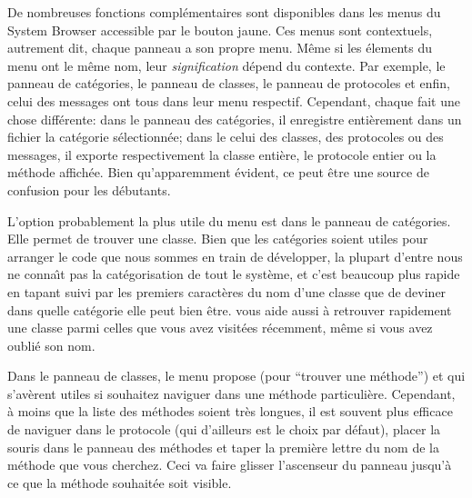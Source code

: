 \documentclass[a4paper,10pt,twoside]{book}
\begin{document}
De nombreuses fonctions compl\'ementaires sont disponibles dans les menus du
System Browser accessible par le bouton jaune. Ces menus sont contextuels, 
autrement dit, chaque panneau a son propre menu.
M\^eme si les \'elements du menu ont le m\^eme nom, leur \emph{signification}
d\'epend du contexte. Par exemple, le panneau de cat\'egories, le
panneau de classes, le panneau de protocoles et enfin, celui des messages
ont tous  dans leur menu respectif. Cependant, chaque 
 fait une chose diff\'erente: dans le panneau des cat\'egories,
il enregistre enti\`erement dans un fichier la cat\'egorie s\'electionn\'ee; dans le celui des classes, des protocoles ou des messages, il exporte respectivement la classe enti\`ere, le protocole entier ou la m\'ethode affich\'ee.
Bien qu'apparemment \'evident, ce peut \^etre une source de confusion pour
les d\'ebutants. 

L'option probablement la plus utile du menu est  
dans le panneau de cat\'egories. 
Elle permet de trouver une classe.  
Bien que les cat\'egories soient utiles pour arranger le code que nous 
sommes en train de d\'evelopper, la plupart d'entre nous ne conna\^{\i}t pas
la cat\'egorisation de tout le syst\`eme, et c'est beaucoup plus rapide
en tapant  suivi par les premiers caract\`eres du nom d'une 
classe que de deviner dans quelle cat\'egorie elle peut bien \^etre.
 vous aide aussi \`a retrouver rapidement
une classe parmi celles que vous avez visit\'ees r\'ecemment, m\^eme si vous
avez oubli\'e son nom.

Dans le panneau de classes, le menu propose  (pour ``trouver
une m\'ethode'') et
 qui s'av\`erent utiles si souhaitez
naviguer dans une m\'ethode particuli\`ere. Cependant, 
\`a moins que la liste des m\'ethodes soient tr\`es longues, il est souvent
plus efficace de naviguer dans le protocole  
(qui d'ailleurs est le choix par d\'efaut), placer la souris dans le
panneau des m\'ethodes et taper la premi\`ere lettre du nom de la m\'ethode
que vous cherchez.
Ceci va faire glisser l'ascenseur du panneau jusqu'\`a ce que la m\'ethode souhait\'ee soit visible.

\end{document}

